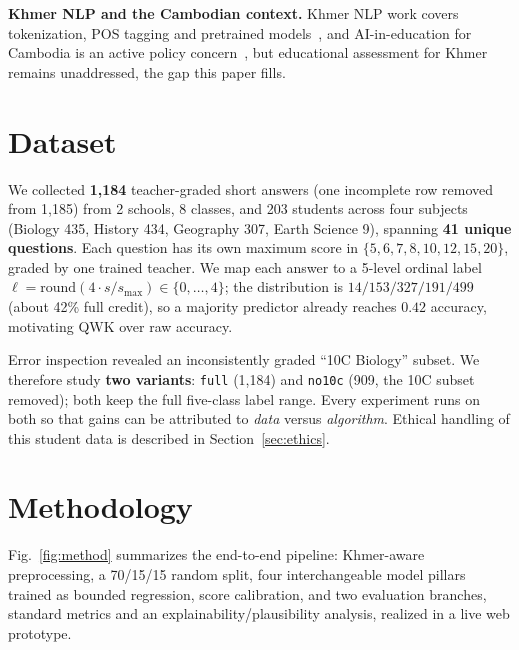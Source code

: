\documentclass[journal]{IEEEtran}
\begin{document}
\textbf{Khmer NLP and the Cambodian context.} Khmer NLP work covers tokenization, POS tagging and
pretrained models~\cite{buoy2022khmer,khmernltk2020}, and AI-in-education for Cambodia is an active
policy concern~\cite{huot2025cambodia}, but educational assessment for Khmer remains
unaddressed, the gap this paper fills.

\section{Dataset}
We collected \textbf{1{,}184} teacher-graded short answers (one incomplete row removed from
1{,}185) from 2 schools, 8 classes, and 203 students across four subjects (Biology 435, History
434, Geography 307, Earth Science 9), spanning \textbf{41 unique questions}. Each question has
its own maximum score in $\{5,6,7,8,10,12,15,20\}$, graded by one trained teacher. We map each
answer to a 5-level ordinal label $\ell=\mathrm{round}(4\cdot s/s_{\max})\in\{0,\dots,4\}$; the
distribution is $14/153/327/191/499$ (about 42\% full credit), so a majority predictor already
reaches $0.42$ accuracy, motivating QWK over raw accuracy.

Error inspection revealed an inconsistently graded ``10C Biology'' subset. We therefore study
\textbf{two variants}: \texttt{full} (1{,}184) and \texttt{no10c} (909, the 10C subset removed); both
keep the full five-class label range. Every experiment runs on both so that gains can be attributed to
\emph{data} versus \emph{algorithm}. Ethical handling of this student data is described in
Section~\ref{sec:ethics}.

\section{Methodology}
Fig.~\ref{fig:method} summarizes the end-to-end pipeline: Khmer-aware preprocessing, a 70/15/15
random split, four interchangeable model pillars trained as bounded
regression, score calibration, and two evaluation branches, standard metrics and an
explainability/plausibility analysis, realized in a live web prototype.
\end{document}
